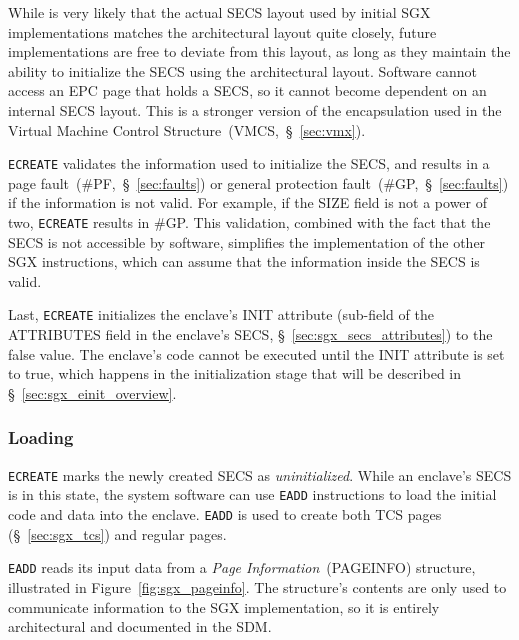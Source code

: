 While is very likely that the actual SECS layout used by initial SGX
implementations matches the architectural layout quite closely, future
implementations are free to deviate from this layout, as long as they maintain
the ability to initialize the SECS using the architectural layout.
Software cannot access an EPC page that holds a SECS, so it cannot become
dependent on an internal SECS layout. This is a stronger version of the
encapsulation used in the Virtual Machine Control
Structure~(VMCS,~\S~\ref{sec:vmx}).

\texttt{ECREATE} validates the information used to initialize the SECS, and
results in a page fault~(\#PF,~\S~\ref{sec:faults}) or general protection
fault~(\#GP,~\S~\ref{sec:faults}) if the information is not valid. For example,
if the SIZE field is not a power of two, \texttt{ECREATE} results in \#GP. This
validation, combined with the fact that the SECS is not accessible by software,
simplifies the implementation of the other SGX instructions, which can assume
that the information inside the SECS is valid.

Last, \texttt{ECREATE} initializes the enclave's INIT attribute (sub-field of
the ATTRIBUTES field in the enclave's SECS, \S~\ref{sec:sgx_secs_attributes})
to the false value. The enclave's code cannot be executed until the INIT
attribute is set to true, which happens in the initialization stage that will
be described in \S~\ref{sec:sgx_einit_overview}.


\subsubsection{Loading}
\label{sec:sgx_eadd}

\texttt{ECREATE} marks the newly created SECS as \textit{uninitialized}. While
an enclave's SECS is in this state, the system software can use \texttt{EADD}
instructions to load the initial code and data into the enclave. \texttt{EADD}
is used to create both TCS pages (\S~\ref{sec:sgx_tcs}) and regular pages.


\texttt{EADD} reads its input data from a \textit{Page Information}~(PAGEINFO)
structure, illustrated in Figure~\ref{fig:sgx_pageinfo}. The structure's
contents are only used to communicate information to the SGX implementation, so
it is entirely architectural and documented in the SDM.

